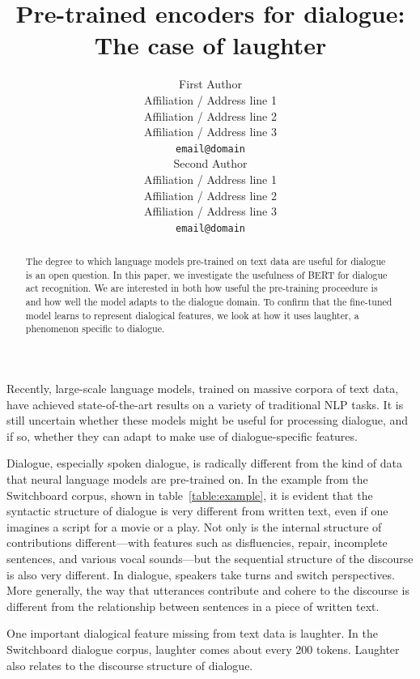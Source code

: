 \documentclass[11pt,a4paper]{article}
\title{Pre-trained encoders for dialogue: The case of laughter}
\author{First Author \\
  Affiliation / Address line 1 \\
  Affiliation / Address line 2 \\
  Affiliation / Address line 3 \\
  \texttt{email@domain} \\\And
  Second Author \\
  Affiliation / Address line 1 \\
  Affiliation / Address line 2 \\
  Affiliation / Address line 3 \\
  \texttt{email@domain} \\}
\date{}
\begin{document}
\maketitle
\begin{abstract}
  The degree to which language models pre-trained on text data are useful for dialogue is an open question.
  In this paper, we investigate the usefulness of BERT for dialogue act recognition.
  We are interested in both how useful the pre-training proceedure is and 
  how well the model adapts to the dialogue domain.
  To confirm that the fine-tuned model learns to represent dialogical features, 
  we look at how it uses laughter, a phenomenon specific to dialogue.
\end{abstract}


Recently, large-scale language models, trained on massive corpora of text data, have achieved state-of-the-art results on a variety of traditional NLP tasks.
It is still uncertain whether these models might be useful for processing dialogue, and if so, whether they can adapt to make use of dialogue-specific features.

Dialogue, especially spoken dialogue, is radically different from the kind of data that neural language models are pre-trained on.
In the example from the Switchboard corpus, shown in table~\ref{table:example}, it is evident that the syntactic structure of dialogue is very different from  written text, even if one imagines a script for a movie or a play.
Not only is the internal structure of contributions different---with features such as disfluencies, repair, incomplete sentences, and various vocal sounds---but the sequential structure of the discourse is also very different.
In dialogue, speakers take turns and switch perspectives.
More generally, the way that utterances contribute and cohere to the discourse is different from the relationship between sentences in a piece of written text.

One important dialogical feature missing from text data is laughter.
In the Switchboard dialogue corpus, laughter comes about every 200 tokens.
Laughter also relates to the discourse structure of dialogue. 
\end{document}
